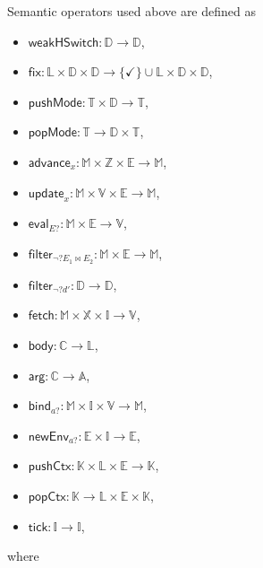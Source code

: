 \documentclass[a4paper]{article}
\newcommand*{\dom}[1]{\mathbb{#1}}
\newcommand*{\body}{\mathsf{body}}
\newcommand*{\Arg}{\mathsf{arg}}
\newcommand*{\weakhsw}{\mathsf{weakHSwitch}}
\newcommand*{\update}{\mathsf{update}}
\newcommand*{\Advance}{\mathsf{advance}}
\newcommand*{\eval}{\mathsf{eval}}
\newcommand*{\fetch}{\mathsf{fetch}}
\newcommand*{\filter}{\mathsf{filter}}
\newcommand*{\pushMode}{\mathsf{pushMode}}
\newcommand*{\popMode}{\mathsf{popMode}}
\newcommand*{\bind}{\mathsf{bind}}
\newcommand*{\newEnv}{\mathsf{newEnv}}
\newcommand*{\pushCtx}{\mathsf{pushCtx}}
\newcommand*{\popCtx}{\mathsf{popCtx}}
\newcommand*{\tick}{\mathsf{tick}}
\begin{document}
Semantic operators used above are defined as
\begin{itemize}
\item $\weakhsw \colon \dom D \to \dom D$,
\item $\mathsf{fix} \colon \dom L \times \dom D \times \dom D \to \{\checkmark\} \cup \dom L \times \dom D \times \dom D$,
\item $\pushMode \colon \dom T \times \dom D \to \dom T$,
\item $\popMode \colon \dom T \to \dom D \times \dom T$,
\item $\Advance_x \colon \dom M \times \dom Z \times \dom E \to \dom M$,
\item $\update_x \colon \dom M \times \dom V \times \dom E \to \dom M$,
\item $\eval_{E?} \colon \dom M \times \dom E \to \dom V$,
\item $\filter_{\neg? E_1 \bowtie E_2} \colon \dom M \times \dom E \to \dom M$,
\item $\filter_{\neg? d'} \colon \dom D \to \dom D$,
\item $\fetch \colon \dom M \times \dom X \times \dom I \to \dom V$,
\item $\body \colon \dom C \to \dom L$,
\item $\Arg \colon \dom C \to \dom A$,
\item $\bind_{a?} \colon \dom M \times \dom I \times \dom V \to \dom M$,
\item $\newEnv_{a?} \colon \dom E \times \dom I \to \dom E$,
\item $\pushCtx \colon \dom K \times \dom L \times \dom E \to \dom K$,
\item $\popCtx \colon \dom K \to \dom L \times \dom E \times \dom K$,
\item $\tick \colon \dom I \to \dom I$,
\end{itemize}
where
\end{document}
